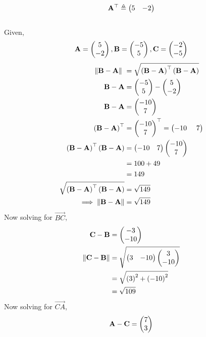 \documentclass[10pt]{book}
\begin{document}
\begin{enumerate}[label=\thesection.\arabic*.,ref=\thesection.\theenumi]
\begin{align}
\begin{split}
\mathbf{A}^{\top}\triangleq\begin{pmatrix}5 & -2\end{pmatrix}
\end{split}
\end{align}
\solution \\
Given,\\
                \begin{align}
                \mathbf{A} = \begin{pmatrix}5 \\ -2\end{pmatrix},
                \mathbf{B} = \begin{pmatrix}-5 \\ 5\end{pmatrix},
                \mathbf{C} = \begin{pmatrix}-2 \\ -5\end{pmatrix}
                \end{align}
                \begin{align}
                \norm{\vec{B}-\vec{A}} \ &= \sqrt{\brak{\vec{B}-\vec{A}}^{\top}\brak{\vec{B}-\vec{A}}} \\
                \vec{B}-\vec{A} &= \myvec{-5 \\ 5} - \myvec{5 \\ -2} \\
                \vec{B}-\vec{A} &= \myvec{-10 \\ 7} \\
                \brak{\vec{B}-\vec{A}}^{\top} &= {\myvec{-10 \\ 7}}^{\top} = \myvec{-10 \ &7} \\
                \brak{\vec{B}-\vec{A}}^{\top}\brak{\vec{B}-\vec{A}} &= \myvec{-10 & 7} \myvec{-10 \\ 7} \\
                 & = 100 + 49 \\
                 & = 149 \\
                \sqrt{\brak{\vec{B}-\vec{A}}^{\top}\brak{\vec{B}-\vec{A}}} &= \sqrt{149} \\
                \label{eq:geo-norm-bc}
                 \implies \norm{\vec{B}-\vec{A}} &= \sqrt{149}
                \end{align}
Now solving for $\vec{BC}$,
\begin{align}
\vec{C}-\vec{B} &= \myvec{-3\\-10}\\
\norm{\vec{C}-\vec{B}} &= \sqrt{\myvec{3 & -10}\myvec{3\\-10}}\\
&= \sqrt{\brak{3}^2 +\brak{-10}^2}\\
&=\sqrt{109}
\label{eq:geo-norm-ab}
\end{align}
Now solving for $\vec{CA}$,
    \begin{align}  
    	\vec{A}-\vec{C} &= \myvec{7\\3}\\

\end{align}
\end{enumerate}
\end{document}
